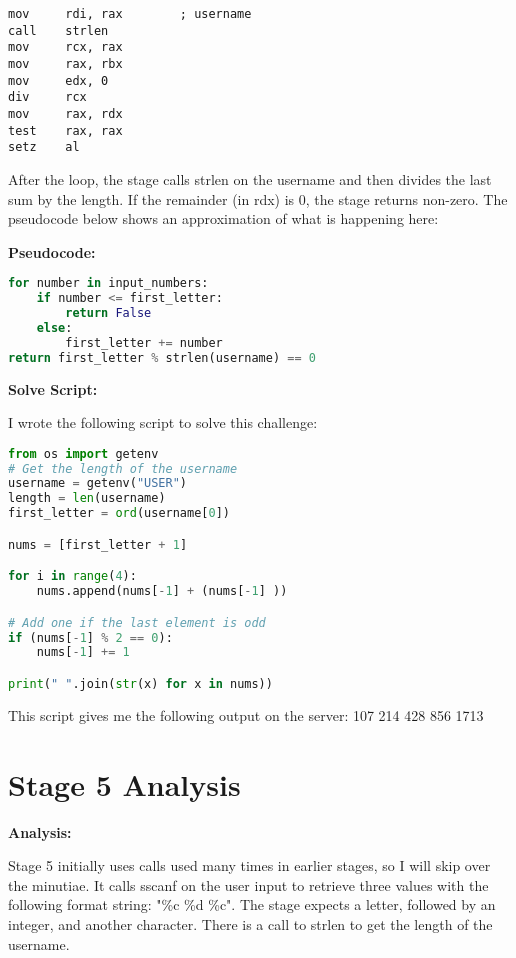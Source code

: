\documentclass{article}
\begin{document}
\begin{lstlisting}
mov     rdi, rax        ; username
call    strlen
mov     rcx, rax
mov     rax, rbx
mov     edx, 0
div     rcx
mov     rax, rdx
test    rax, rax
setz    al
\end{lstlisting}
\par
After the loop, the stage calls strlen on the username and then divides the
last sum by the length.  If the remainder (in rdx) is 0, the stage returns 
non-zero.  The pseudocode below shows an approximation of what is happening 
here:

\begin{flushleft}
\textbf{Pseudocode:}
\vspace{.5pc}
\end{flushleft}
\begin{lstlisting}[language=Python]
for number in input_numbers:
	if number <= first_letter:
		return False
	else:
		first_letter += number
return first_letter % strlen(username) == 0
\end{lstlisting}

\begin{flushleft}
\textbf{Solve Script:}
\vspace{.5pc}
\end{flushleft}
\par
I wrote the following script to solve this challenge:
\begin{lstlisting}[language=Python]
from os import getenv
# Get the length of the username
username = getenv("USER")
length = len(username)
first_letter = ord(username[0])

nums = [first_letter + 1]

for i in range(4):
    nums.append(nums[-1] + (nums[-1] ))

# Add one if the last element is odd
if (nums[-1] % 2 == 0):
    nums[-1] += 1

print(" ".join(str(x) for x in nums))
\end{lstlisting}
\par
This script gives me the following output on the server: 107 214 428 856 1713

\newpage
\section{Stage 5 Analysis}
\begin{flushleft}
\vspace{.5pc}
\end{flushleft}

\begin{flushleft}
\textbf{Analysis:}
\vspace{.5pc}
\end{flushleft}
\par
Stage 5 initially uses calls used many times in earlier stages, so I will 
skip over the minutiae.  It calls sscanf on the user input to retrieve three 
values with the following format string: "\%c \%d \%c".  The stage expects
a letter, followed by an integer, and another character.  There is a call to 
strlen to get the length of the username.  
\end{document}
